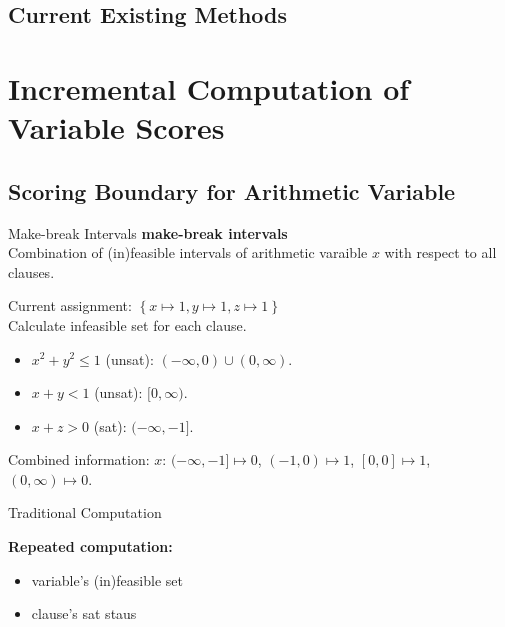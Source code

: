 \subsection{Current Existing Methods}

\section{Incremental Computation of Variable Scores}
\subsection{Scoring Boundary for Arithmetic Variable}

\begin{frame}{Make-break Intervals}
    \textbf{make-break intervals} \\
    Combination of (in)feasible intervals of arithmetic varaible $x$ with respect to all clauses.

    \begin{example}
        Current assignment: $\left\{ x\mapsto 1, y\mapsto 1, z\mapsto 1 \right\}$ \\
        Calculate infeasible set for each clause.
        \begin{itemize}
            \item $x^2+y^2\le 1$ (unsat): $(-\infty, 0) \cup (0, \infty)$.
            \item $x+y<1$ (unsat): $[0,\infty)$.
            \item $x+z>0$ (sat): $(-\infty,-1]$.
        \end{itemize}
        Combined information: $x$: $(-\infty,-1]\mapsto 0$, $(-1,0)\mapsto 1$, $[0,0]\mapsto 1$, $(0,\infty)\mapsto 0$.
    \end{example}
\end{frame}

\begin{frame}{Traditional Computation}
    \begin{algorithm}[H]
        \SetAlgoLined
    \end{algorithm}
    
    \vspace{0.4cm}
    \textbf{Repeated computation:}\\
    \begin{itemize}
        \item variable's (in)feasible set
        \item clause's sat staus
    \end{itemize}

\end{frame}

